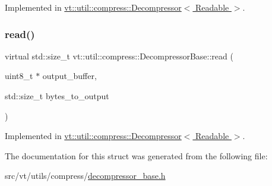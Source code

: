 Implemented in \hyperlink{structvt_1_1util_1_1compress_1_1_decompressor_a68ee22d625a76f53fbda4b829863d01d}{vt\+::util\+::compress\+::\+Decompressor$<$ Readable $>$}.

\mbox{\label{structvt_1_1util_1_1compress_1_1_decompressor_base_ab203ef8c8540beae635abd77d0409df1}} 
\subsubsection{\texorpdfstring{read()}{read()}}
{\footnotesize\ttfamily virtual std\+::size\+\_\+t vt\+::util\+::compress\+::\+Decompressor\+Base\+::read (\begin{DoxyParamCaption}\item[{uint8\+\_\+t $\ast$}]{output\+\_\+buffer,  }\item[{std\+::size\+\_\+t}]{bytes\+\_\+to\+\_\+output }\end{DoxyParamCaption})\hspace{0.3cm}{\ttfamily [pure virtual]}}



Implemented in \hyperlink{structvt_1_1util_1_1compress_1_1_decompressor_a75d6946b3e1526fcf0cc6931f5e61774}{vt\+::util\+::compress\+::\+Decompressor$<$ Readable $>$}.



The documentation for this struct was generated from the following file\+:\begin{DoxyCompactItemize}
\item 
src/vt/utils/compress/\hyperlink{decompressor__base_8h}{decompressor\+\_\+base.\+h}\end{DoxyCompactItemize}
